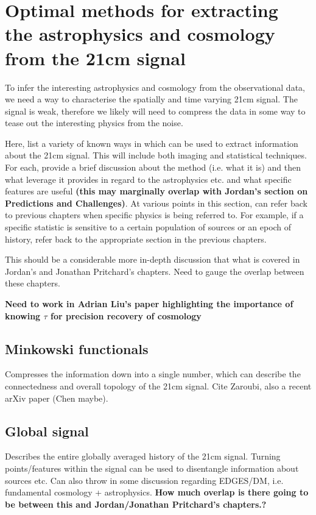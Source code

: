 \section{Optimal methods for extracting the astrophysics and cosmology from the 21cm signal}

To infer the interesting astrophysics and cosmology from the observational data, we need a way to characterise the spatially and time varying 21cm signal. The signal is weak, therefore we likely will need to compress the data in some way to tease out the interesting physics from the noise.

Here, list a variety of known ways in which can be used to extract information about the 21cm signal. This will include both imaging and statistical techniques. For each, provide a brief discussion about the method (i.e. what it is) and then what leverage it provides in regard to the astrophysics etc. and what specific features are useful \textbf{(this may marginally overlap with Jordan's section on Predictions and Challenges)}. At various points in this section, can refer back to previous chapters when specific physics is being referred to. For example, if a specific statistic is sensitive to a certain population of sources or an epoch of history, refer back to the appropriate section in the previous chapters.

This should be a considerable more in-depth discussion that what is covered in Jordan's and Jonathan Pritchard's chapters. Need to gauge the overlap between these chapters.

\textbf{Need to work in Adrian Liu's paper highlighting the importance of knowing $\tau$ for precision recovery of cosmology}

\subsection{Minkowski functionals}

Compresses the information down into a single number, which can describe the connectedness and overall topology of the 21cm signal. Cite Zaroubi, also a recent arXiv paper (Chen maybe).

\subsection{Global signal}

Describes the entire globally averaged history of the 21cm signal. Turning points/features within the signal can be used to disentangle information about sources etc. Can also throw in some discussion regarding EDGES/DM, i.e. fundamental cosmology + astrophysics. \textbf{How much overlap is there going to be between this and Jordan/Jonathan Pritchard's chapters.?}

